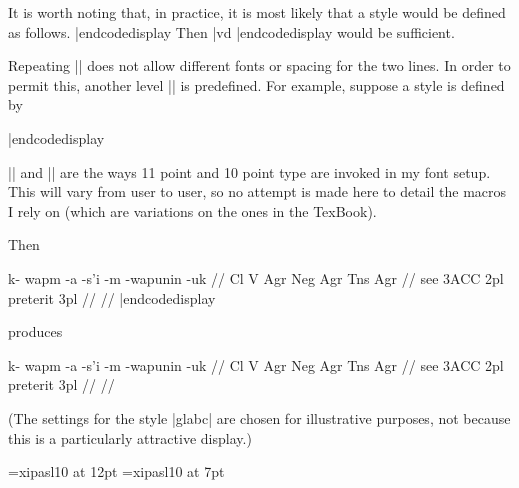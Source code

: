 It is worth noting that, in practice, it is most likely that
a style would be defined as follows.
\codedisplay
{}
|endcodedisplay
Then \def\vd{\hbox{$\qquad \vdots$}}
\codedisplay
\ex[lingstyle=glabb]
\begingl
|vd
\endgl
\xe
|endcodedisplay
\noindent would be sufficient.

Repeating |\glb| does not allow different fonts or spacing for the two
lines.  In order to permit this, another level |\glc| is
predefined.  For example, suppose a style is defined by

\codedisplay
{}
|endcodedisplay

\noindent |\elevenpoint| and |\tenpoint| are the ways 11 point
and 10 point type are invoked in my font setup.  This will vary
from user to user, so no attempt is made here to detail the
macros I rely on (which are variations on the ones in the
TexBook).

\def\tenpoint{\tenrm \let\sc\eightrm}%
\def\elevenpoint{\elevenrm}

Then

\codedisplay
\ex[lingstyle=glabc,gltype=multilevel]
\begingl
\gla k- wapm -a -s'i -m -wapunin -uk //
\glb Cl V Agr Neg Agr Tns Agr //
 see {3\sc ACC} {} 2pl preterit 3pl //
//
\endgl
\xe
|endcodedisplay

produces

\framedisplay
\ex[lingstyle=glabc,gltype=multilevel]
\begingl
\gla k- wapm -a -s'i -m -wapunin -uk //
\glb Cl V Agr Neg Agr Tns Agr //
 see {3\sc ACC} {} 2pl preterit 3pl //
//
\endgl
\xe
\endframedisplay

\noindent (The settings for the style |glabc| are chosen for
illustrative purposes, not because this is a particularly
attractive display.)




\font\ips=xipasl10 at 12pt
\font\ipss=xipasl10 at 7pt
\def\mroot{$\surd$}
\def\L{\char'354}
\def\v#1{{\accent"07 #1}}
\def\C{{\accent"07 c}}
\def\W{$^{\hbox{\ipss w}}\mskip-2mu$}

